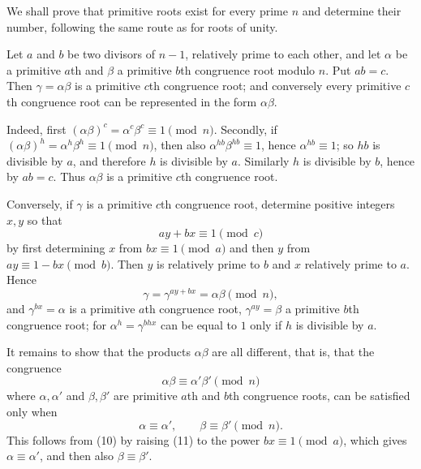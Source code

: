 \documentclass[11pt]{article}
\begin{document}
We shall prove that primitive roots exist for every prime $n$ and determine their number, following the same route as for roots of unity.

Let $a$ and $b$ be two divisors of $n-1$, relatively prime to each other, and let $\alpha$ be a primitive $a$th and $\beta$ a primitive $b$th congruence root modulo $n$. Put $ab=c$. Then $\gamma=\alpha\beta$ is a primitive $c$th congruence root; and conversely every primitive $c$th congruence root can be represented in the form $\alpha\beta$.

Indeed, first $(\alpha\beta)^c=\alpha^c\beta^c\equiv1\pmod n$. Secondly, if $(\alpha\beta)^h=\alpha^h\beta^h\equiv1\pmod n$, then also $\alpha^{hb}\beta^{hb}\equiv1$, hence $\alpha^{hb}\equiv1$; so $hb$ is divisible by $a$, and therefore $h$ is divisible by $a$. Similarly $h$ is divisible by $b$, hence by $ab=c$. Thus $\alpha\beta$ is a primitive $c$th congruence root.

Conversely, if $\gamma$ is a primitive $c$th congruence root, determine positive integers $x,y$ so that
\[
\tag{10}       ay+bx\equiv1\pmod c
\]
by first determining $x$ from $bx\equiv1\pmod a$ and then $y$ from $ay\equiv1-bx\pmod b$. Then $y$ is relatively prime to $b$ and $x$ relatively prime to $a$. Hence
\[
        \gamma=\gamma^{ay+bx}=\alpha\beta\pmod n,
\]
and $\gamma^{bx}=\alpha$ is a primitive $a$th congruence root, $\gamma^{ay}=\beta$ a primitive $b$th congruence root; for $\alpha^h=\gamma^{bhx}$ can be equal to $1$ only if $h$ is divisible by $a$.

It remains to show that the products $\alpha\beta$ are all different, that is, that the congruence
\[
\tag{11}       \alpha\beta\equiv\alpha'\beta'\pmod n
\]
where $\alpha,\alpha'$ and $\beta,\beta'$ are primitive $a$th and $b$th congruence roots, can be satisfied only when
\[
        \alpha\equiv\alpha',\qquad \beta\equiv\beta'\pmod n.
\]
This follows from (10) by raising (11) to the power $bx\equiv1\pmod a$, which gives $\alpha\equiv\alpha'$, and then also $\beta\equiv\beta'$.
\end{document}
